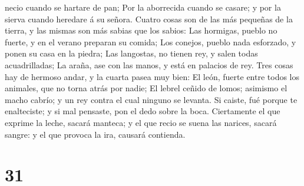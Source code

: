 necio cuando se hartare de pan;  Por la aborrecida cuando
se casare; y por la sierva cuando heredare á su señora. 
Cuatro cosas son de las más pequeñas de la tierra, y las mismas son más
sabias que los sabios:  Las hormigas, pueblo no fuerte, y
en el verano preparan su comida;  Los conejos, pueblo nada
esforzado, y ponen su casa en la piedra;  Las langostas, no
tienen rey, y salen todas acuadrilladas;  La araña, ase con
las manos, y está en palacios de rey.  Tres cosas hay de
hermoso andar, y la cuarta pasea muy bien:  El león, fuerte
entre todos los animales, que no torna atrás por nadie;  El
lebrel ceñido de lomos; asimismo el macho cabrío; y un rey contra el
cual ninguno se levanta.  Si caiste, fué porque te
enalteciste; y si mal pensaste, pon el dedo sobre la boca. 
Ciertamente el que exprime la leche, sacará manteca; y el que recio se
suena las narices, sacará sangre: y el que provoca la ira, causará
contienda.

\hypertarget{section-30}{%
\section{31}\label{section-30}}

